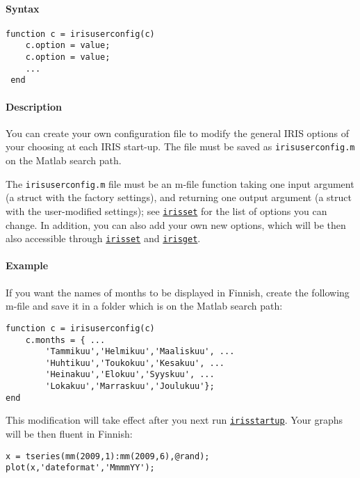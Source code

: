 


	\paragraph{Syntax}

\begin{verbatim}
function c = irisuserconfig(c)
    c.option = value;
    c.option = value;
    ...
 end
\end{verbatim}

\paragraph{Description}

You can create your own configuration file to modify the general IRIS
options of your choosing at each IRIS start-up. The file must be saved
as \texttt{irisuserconfig.m} on the Matlab search path.

The \texttt{irisuserconfig.m} file must be an m-file function taking one
input argument (a struct with the factory settings), and returning one
output argument (a struct with the user-modified settings); see
\href{config/irisset}{\texttt{irisset}} for the list of options you can
change. In addition, you can also add your own new options, which will
be then also accessible through \href{config/irisset}{\texttt{irisset}}
and \href{config/irisget}{\texttt{irisget}}.

\paragraph{Example}

If you want the names of months to be displayed in Finnish, create the
following m-file and save it in a folder which is on the Matlab search
path:

\begin{verbatim}
function c = irisuserconfig(c)
    c.months = { ...
        'Tammikuu','Helmikuu','Maaliskuu', ...
        'Huhtikuu','Toukokuu','Kesakuu', ...
        'Heinakuu','Elokuu','Syyskuu', ...
        'Lokakuu','Marraskuu','Joulukuu'};
end
\end{verbatim}

This modification will take effect after you next run
\href{config/irisstartup}{\texttt{irisstartup}}. Your graphs will be
then fluent in Finnish:

\begin{verbatim}
x = tseries(mm(2009,1):mm(2009,6),@rand);
plot(x,'dateformat','MmmmYY');
\end{verbatim}


